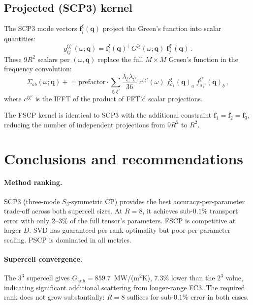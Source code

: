 \documentclass[11pt]{article}
\newcommand{\vc}[1]{\bm{#1}}
\newcommand{\vq}{\vc{q}}
\begin{document}
\subsection{Projected (SCP3) kernel}
\label{sec:proj_kernel}

The SCP3 mode vectors $\vc{f}_i^\xi(\vq)$ project the Green's function
into scalar quantities:
\begin{equation}
  g_{ij}^{\xi\xi'}(\omega; \vq)
  = \vc{f}_i^{\xi}(\vq)^\dagger\;
    G^{\gtrless}(\omega; \vq)\;
    \vc{f}_j^{\xi'}(\vq)\,.
\end{equation}
These $9R^2$ scalars per $(\omega, \vq)$ replace the full
$M \times M$ Green's function in the frequency convolution:
\begin{equation}
  \Sigma_{ab}(\omega; \vq)
  \mathrel{+}=
  \mathrm{prefactor} \cdot
  \sum_{\xi,\xi'}
  \frac{\lambda_\xi \lambda_{\xi'}}{36}\;
  c^{\xi\xi'}(\omega)\;
  f_{\sigma_1}^{\xi}(\vq)_a\;
  \overline{f_{\sigma_1'}^{\xi'}(\vq)_b}\,,
\end{equation}
where $c^{\xi\xi'}$ is the IFFT of the product of FFT'd scalar
projections.

The FSCP kernel is identical to SCP3 with the additional constraint
$\vc{f}_1 = \vc{f}_2 = \vc{f}_3$, reducing the number of independent
projections from $9R^2$ to $R^2$.


\section{Conclusions and recommendations}
\label{sec:conclusions}

\paragraph{Method ranking.}
SCP3 (three-mode $S_3$-symmetric CP) provides the best
accuracy-per-parameter trade-off across both supercell sizes.
At $R=8$, it achieves sub-$0.1\%$ transport error with only 2--3\%
of the full tensor's parameters.  FSCP is competitive at larger $D$.
SVD has guaranteed per-rank optimality but poor per-parameter
scaling.  PSCP is dominated in all metrics.

\paragraph{Supercell convergence.}
The $3^3$ supercell gives $G_\mathrm{anh} = 859.7$~MW/(m$^2$K),
7.3\% lower than the $2^3$ value, indicating significant
additional scattering from longer-range FC3.  The required rank
does not grow substantially: $R=8$ suffices for sub-$0.1\%$ error
in both cases.
\end{document}

